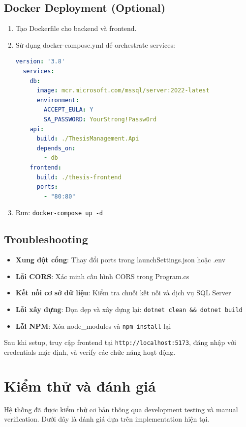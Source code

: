 \documentclass[conference,a4paper]{IEEEtran}
\begin{document}
\subsection{Docker Deployment (Optional)}
\begin{enumerate}
  \item Tạo Dockerfile cho backend và frontend.
  \item Sử dụng docker-compose.yml để orchestrate services:
  \begin{lstlisting}[language=YAML,caption=docker-compose.yml]
  version: '3.8'
  services:
    db:
      image: mcr.microsoft.com/mssql/server:2022-latest
      environment:
        ACCEPT_EULA: Y
        SA_PASSWORD: YourStrong!Passw0rd
    api:
      build: ./ThesisManagement.Api
      depends_on:
        - db
    frontend:
      build: ./thesis-frontend
      ports:
        - "80:80"
  \end{lstlisting}
  \item Run: \texttt{docker-compose up -d}
\end{enumerate}

\subsection{Troubleshooting}
\begin{itemize}
  \item \textbf{Xung đột cổng}: Thay đổi ports trong launchSettings.json hoặc .env
  \item \textbf{Lỗi CORS}: Xác minh cấu hình CORS trong Program.cs
  \item \textbf{Kết nối cơ sở dữ liệu}: Kiểm tra chuỗi kết nối và dịch vụ SQL Server
  \item \textbf{Lỗi xây dựng}: Dọn dẹp và xây dựng lại: \texttt{dotnet clean \&\& dotnet build}
  \item \textbf{Lỗi NPM}: Xóa node\_modules và \texttt{npm install} lại
\end{itemize}

Sau khi setup, truy cập frontend tại \texttt{http://localhost:5173}, đăng nhập với credentials mặc định, và verify các chức năng hoạt động.

\section{Kiểm thử và đánh giá}
Hệ thống đã được kiểm thử cơ bản thông qua development testing và manual verification. Dưới đây là đánh giá dựa trên implementation hiện tại.
\end{document}
